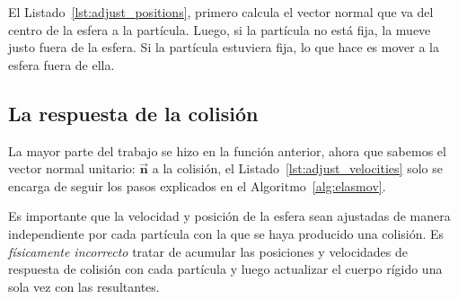 
El Listado~\ref{lst:adjust_positions}, primero calcula el vector normal que va del centro de la esfera a la partícula.
Luego, si la partícula no está fija, la mueve justo fuera de la esfera.
Si la partícula estuviera fija, lo que hace es mover a la esfera fuera de ella.

\subsection{La respuesta de la colisión}
La mayor parte del trabajo se hizo en la función anterior, ahora que sabemos el vector normal unitario: $\vec{\textbf{n}}$ a la colisión, el Listado~\ref{lst:adjust_velocities} solo se encarga de seguir los pasos explicados en el Algoritmo~\ref{alg:elasmov}.


Es importante que la velocidad y posición de la esfera sean ajustadas de manera independiente por cada partícula con la que se haya producido una colisión.
Es \emph{físicamente incorrecto} tratar de acumular las posiciones y velocidades de respuesta de colisión con cada partícula y luego actualizar el cuerpo rígido una sola vez con las resultantes.
